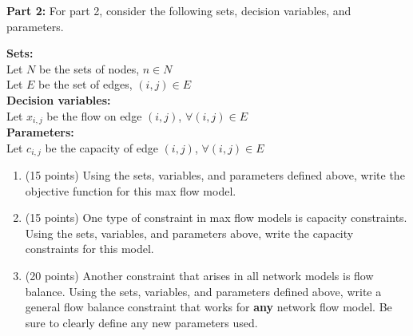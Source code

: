 \documentclass[letterpaper,oneside,12pt]{article}%
\begin{document}
\textbf{Part 2:} For part 2, consider the following sets, decision variables, and parameters.

\noindent \textbf{Sets:}\\
\noindent Let $N$ be the sets of nodes, $n \in N$\\
Let $E$ be the set of edges, $(i,j) \in E$\\


\noindent \textbf{Decision variables:} \\
\noindent Let $x_{i,j}$ be the flow on edge $(i,j)$, $\forall (i,j) \in E$\\

\noindent \textbf{Parameters:}\\%
\noindent Let $c_{i,j}$ be the capacity of edge $(i,j)$, $\forall (i,j) \in E$


\begin{enumerate}[resume]
\item (15 points) Using the sets, variables, and parameters defined above, write the objective function for this max flow model. \vspace{2in}
\item (15 points) One type of constraint in max flow models is capacity constraints. Using the sets, variables, and parameters above, write the capacity constraints for this model. \vspace{2in}
\item (20 points) Another constraint that arises in all network models is flow balance. Using the sets, variables, and parameters defined above, write a general flow balance constraint that works for \textbf{any} network flow model. Be sure to clearly define any new parameters used. \vspace{2in}
\end{enumerate}
\end{document}
